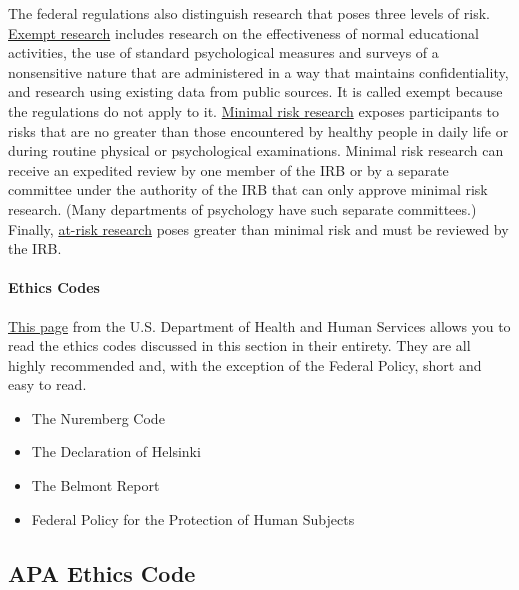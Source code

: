 \documentclass[
]{krantz}
\providecommand{\tightlist}{%
  \setlength{\itemsep}{0pt}\setlength{\parskip}{0pt}}
\begin{document}
The federal regulations also distinguish research that poses three levels of risk. \protect\hyperlink{exempt-research}{Exempt research} includes research on the effectiveness of normal educational activities, the use of standard psychological measures and surveys of a nonsensitive nature that are administered in a way that maintains confidentiality, and research using existing data from public sources. It is called exempt because the regulations do not apply to it. \protect\hyperlink{minimal-risk-research}{Minimal risk research} exposes participants to risks that are no greater than those encountered by healthy people in daily life or during routine physical or psychological examinations. Minimal risk research can receive an expedited review by one member of the IRB or by a separate committee under the authority of the IRB that can only approve minimal risk research. (Many departments of psychology have such separate committees.) Finally, \protect\hyperlink{at-risk-research}{at-risk research} poses greater than minimal risk and must be reviewed by the IRB.

\hypertarget{ethics-codes}{%
\paragraph*{Ethics Codes}\label{ethics-codes}}

\href{https://www.hhs.gov/ohrp/international/ethical-codes-and-research-standards/index.html}{This page} from the U.S. Department of Health and Human Services allows you to read the ethics codes discussed in this section in their entirety. They are all highly recommended and, with the exception of the Federal Policy, short and easy to read.

\begin{itemize}
\tightlist
\item
  The Nuremberg Code
\item
  The Declaration of Helsinki
\item
  The Belmont Report
\item
  Federal Policy for the Protection of Human Subjects
\end{itemize}

\hypertarget{apa-ethics-code}{%
\subsection*{APA Ethics Code}\label{apa-ethics-code}}
\end{document}
